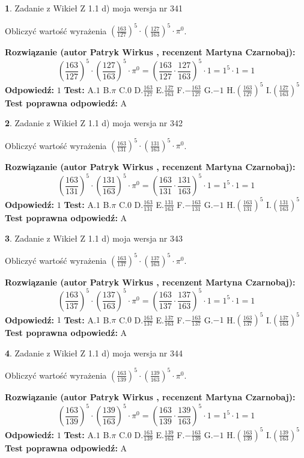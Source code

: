 \documentclass[12pt, a4paper]{article}
\theoremstyle{definition} %
\newtheorem{zad}{}
\newcommand{\zadStart}[1]{\begin{zad}#1\newline}
\newcommand{\zadStop}{\end{zad}}
\newcommand{\rozwStart}[2]{\noindent \textbf{Rozwiązanie (autor #1 , recenzent #2): }\newline}
\newcommand{\rozwStop}{\newline}
\newcommand{\odpStart}{\noindent \textbf{Odpowiedź:}\newline}
\newcommand{\odpStop}{\newline}
\newcommand{\testStart}{\noindent \textbf{Test:}\newline}
\newcommand{\testStop}{\newline}
\newcommand{\kluczStart}{\noindent \textbf{Test poprawna odpowiedź:}\newline}
\newcommand{\kluczStop}{\newline}
\begin{document}
\zadStart{Zadanie z Wikieł Z 1.1 d) moja wersja nr 341}

Obliczyć wartość wyrażenia $(\frac{163}{127})^{5} \cdot (\frac{127}{163})^{5} \cdot \pi^{0}$.
\zadStop
\rozwStart{Patryk Wirkus}{Martyna Czarnobaj}
$$(\frac{163}{127})^{5} \cdot (\frac{127}{163})^{5} \cdot \pi^{0} = (\frac{163}{127} \cdot \frac{127}{163})^{5} \cdot 1 = 1^{5} \cdot 1 = 1$$
\rozwStop
\odpStart
$1$
\odpStop
\testStart
A.$1$ B.$\pi$ C.$0$ D.$\frac{163}{127}$ E.$\frac{127}{163}$
F.$-\frac{163}{127}$ G.$-1$
H.$(\frac{163}{127})^{5}$
I.$(\frac{127}{163})^{5}$
\testStop
\kluczStart
A
\kluczStop



\zadStart{Zadanie z Wikieł Z 1.1 d) moja wersja nr 342}

Obliczyć wartość wyrażenia $(\frac{163}{131})^{5} \cdot (\frac{131}{163})^{5} \cdot \pi^{0}$.
\zadStop
\rozwStart{Patryk Wirkus}{Martyna Czarnobaj}
$$(\frac{163}{131})^{5} \cdot (\frac{131}{163})^{5} \cdot \pi^{0} = (\frac{163}{131} \cdot \frac{131}{163})^{5} \cdot 1 = 1^{5} \cdot 1 = 1$$
\rozwStop
\odpStart
$1$
\odpStop
\testStart
A.$1$ B.$\pi$ C.$0$ D.$\frac{163}{131}$ E.$\frac{131}{163}$
F.$-\frac{163}{131}$ G.$-1$
H.$(\frac{163}{131})^{5}$
I.$(\frac{131}{163})^{5}$
\testStop
\kluczStart
A
\kluczStop



\zadStart{Zadanie z Wikieł Z 1.1 d) moja wersja nr 343}

Obliczyć wartość wyrażenia $(\frac{163}{137})^{5} \cdot (\frac{137}{163})^{5} \cdot \pi^{0}$.
\zadStop
\rozwStart{Patryk Wirkus}{Martyna Czarnobaj}
$$(\frac{163}{137})^{5} \cdot (\frac{137}{163})^{5} \cdot \pi^{0} = (\frac{163}{137} \cdot \frac{137}{163})^{5} \cdot 1 = 1^{5} \cdot 1 = 1$$
\rozwStop
\odpStart
$1$
\odpStop
\testStart
A.$1$ B.$\pi$ C.$0$ D.$\frac{163}{137}$ E.$\frac{137}{163}$
F.$-\frac{163}{137}$ G.$-1$
H.$(\frac{163}{137})^{5}$
I.$(\frac{137}{163})^{5}$
\testStop
\kluczStart
A
\kluczStop



\zadStart{Zadanie z Wikieł Z 1.1 d) moja wersja nr 344}

Obliczyć wartość wyrażenia $(\frac{163}{139})^{5} \cdot (\frac{139}{163})^{5} \cdot \pi^{0}$.
\zadStop
\rozwStart{Patryk Wirkus}{Martyna Czarnobaj}
$$(\frac{163}{139})^{5} \cdot (\frac{139}{163})^{5} \cdot \pi^{0} = (\frac{163}{139} \cdot \frac{139}{163})^{5} \cdot 1 = 1^{5} \cdot 1 = 1$$
\rozwStop
\odpStart
$1$
\odpStop
\testStart
A.$1$ B.$\pi$ C.$0$ D.$\frac{163}{139}$ E.$\frac{139}{163}$
F.$-\frac{163}{139}$ G.$-1$
H.$(\frac{163}{139})^{5}$
I.$(\frac{139}{163})^{5}$
\testStop
\kluczStart
A
\kluczStop
\end{document}
